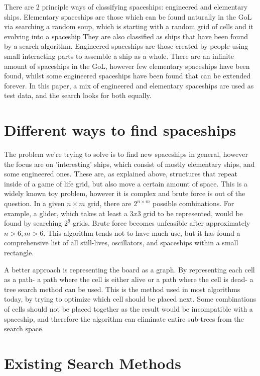 \documentclass{l4proj}
\begin{document}
There are 2 principle ways of classifying spaceships: engineered and elementary ships. Elementary spaceships are those which can be found naturally in the GoL via searching a random soup, which is starting with a random grid of cells and it evolving into a spaceship They are also classified as ships that have been found by a search algorithm. Engineered spaceships are those created by people using small interacting parts to assemble a ship as a whole. There are an infinite amount of spaceships in the GoL, however few elementary spaceships have been found, whilst some engineered spaceships have been found that can be extended forever. In this paper, a mix of engineered and elementary spaceships are used as test data, and the search looks for both equally.


\section{Different ways to find spaceships}

The problem we're trying to solve is to find new spaceships in general, however the focus are on 'interesting' ships, which consist of mostly elementary ships, and some engineered ones. These are, as explained above, structures that repeat inside of a game of life grid, but also move a certain amount of space. This is a widely known toy problem, however it is complex and brute force is out of the question. In a given $n \times m$ grid, there are $2^{n \times m}$ possible combinations. For example, a glider, which takes at least a $3x3$ grid to be represented, would be found by searching $2^{9}$ grids. Brute force becomes unfeasible after approximately $n > 6, m > 6$. This algorithm tends not to have much use, but it has found a comprehensive list of all still-lives, oscillators, and spaceships within a small rectangle.

A better approach is representing the board as a graph. By representing each cell as a path- a path where the cell is either alive or a path where the cell is dead- a tree search method can be used. This is the method used in most algorithms today, by trying to optimize which cell should be placed next. Some combinations of cells should not be placed together as the result would be incompatible with a spaceship, and therefore the algorithm can eliminate entire sub-trees from the search space.

\section{Existing Search Methods}
\end{document}
